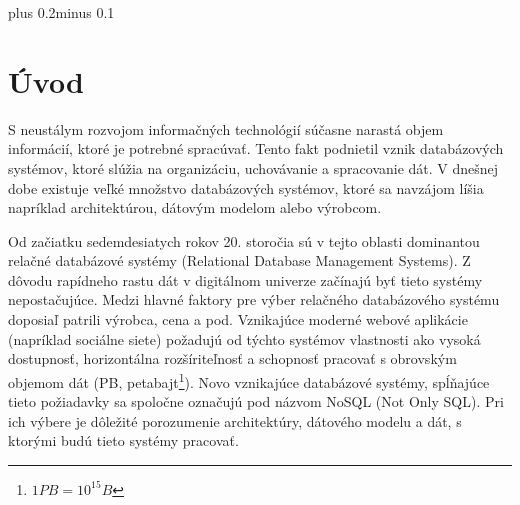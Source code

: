 \documentclass[11pt,twoside,a4paper]{book}
\begin{document}
\tableofcontents



\listoffigures



\listoftables



\mainbodystarts
\normalfont
{}\baselineskip plus 0.2\baselineskip minus 0.1\baselineskip



% 
% 

\chapter{Úvod}
S neustálym rozvojom informačných technológií súčasne narastá objem informácií, ktoré je potrebné spracúvať. Tento fakt podnietil vznik databázových systémov, ktoré slúžia na organizáciu, uchovávanie a spracovanie dát. V dnešnej dobe existuje veľké množstvo databázových systémov, ktoré sa navzájom líšia napríklad architektúrou, dátovým modelom alebo výrobcom.

Od začiatku sedemdesiatych rokov 20. storočia sú v tejto oblasti dominantou relačné databázové systémy (Relational Database Management Systems). Z dôvodu rapídneho rastu dát v digitálnom univerze \cite{Gantz_Mcarthur_Minton_2007} začínajú byť tieto systémy nepostačujúce. Medzi hlavné faktory pre výber relačného databázového systému doposiaľ patrili výrobca, cena a pod. Vznikajúce moderné webové aplikácie (napríklad sociálne siete) požadujú od týchto systémov vlastnosti ako vysoká dostupnosť, horizontálna rozšíriteľnosť a schopnosť pracovať s obrovským objemom dát (PB, petabajt\footnote{$ 1PB = 10^{15} B$}). Novo vznikajúce databázové systémy, spĺňajúce tieto požiadavky sa spoločne označujú pod názvom NoSQL (Not Only SQL). Pri ich výbere je dôležité porozumenie architektúry, dátového modelu a dát, s ktorými budú tieto systémy pracovať.
\end{document}
